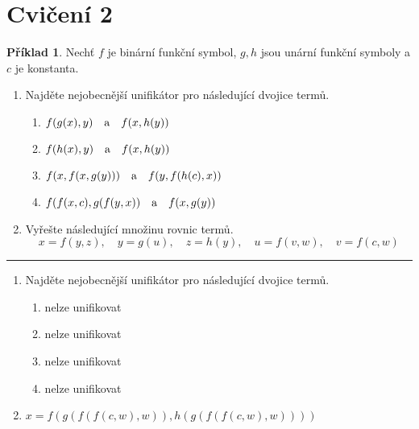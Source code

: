 \documentclass[a4paper]{article}
\theoremstyle{definition}
\newtheorem{priklad}{Příklad}
\begin{document}
\section*{Cvičení 2}
\setcounter{priklad}{0}
\begin{priklad}
    Nechť $ f $ je binární funkční symbol, $ g,h $ jsou unární funkční symboly a $ c $ je konstanta.
    \begin{enumerate}
        \item Najděte nejobecnější unifikátor pro následující dvojice termů.
        \begin{enumerate}
            \item $ f(g(x),y) \mbox{\quad a\quad} f(x,h(y))$
            \item $ f(h(x),y) \mbox{\quad a\quad} f(x,h(y))$
            \item $ f(x,f(x,g(y))) \mbox{\quad a\quad} f(y,f(h(c),x))$
            \item $ f(f(x,c),g(f(y,x)) \mbox{\quad a\quad} f(x,g(y))$
        \end{enumerate}
        \item Vyřešte následující množinu rovnic termů.
        \[ x=f(y,z),\quad y=g(u),\quad z=h(y),\quad u=f(v,w),\quad v=f(c,w) \]
    \end{enumerate}
\noindent\rule{\linewidth}{.2pt}
    \begin{enumerate}
        \item Najděte nejobecnější unifikátor pro následující dvojice termů.
        \begin{enumerate}
            \item nelze unifikovat
            \item nelze unifikovat
            \item nelze unifikovat
            \item nelze unifikovat
        \end{enumerate}
        \item $ x=f(g(f(f(c,w),w)),h(g(f(f(c,w),w)))) $
    \end{enumerate}
\end{priklad}
\end{document}
